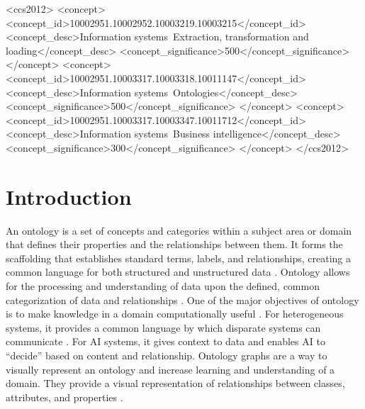 \documentclass[sigconf]{acmart}
\begin{document}
\begin{CCSXML}
	<ccs2012>
	<concept>
	<concept_id>10002951.10002952.10003219.10003215</concept_id>
	<concept_desc>Information systems~Extraction, transformation and loading</concept_desc>
	<concept_significance>500</concept_significance>
	</concept>
	<concept>
	<concept_id>10002951.10003317.10003318.10011147</concept_id>
	<concept_desc>Information systems~Ontologies</concept_desc>
	<concept_significance>500</concept_significance>
	</concept>
	<concept>
	<concept_id>10002951.10003317.10003347.10011712</concept_id>
	<concept_desc>Information systems~Business intelligence</concept_desc>
	<concept_significance>300</concept_significance>
	</concept>
	</ccs2012>
\end{CCSXML}



\maketitle

\section{Introduction}
An ontology is a set of concepts and categories within a subject area or domain that defines their properties and the relationships between them. It forms the scaffolding that establishes standard terms, labels, and relationships, creating a common language for both structured and unstructured data \cite{gruber1993ontology, chari2020explanation}. Ontology allows for the processing and understanding of data upon the defined, common categorization of data and relationships \cite{yue2024csm}. One of the major objectives of ontology is to make knowledge in a domain computationally useful \cite{tudorache2020ontology}. For heterogeneous systems, it provides a common language by which disparate systems can communicate \cite{fraga2020ontology, yue2024csm}. For AI systems, it gives context to data and enables AI to “decide” based on content and relationship. Ontology graphs are a way to visually represent an ontology and increase learning and understanding of a domain. They provide a visual representation of relationships between classes, attributes, and properties \cite{gutierrez2018knowledge, yue2021applying}.
\end{document}
